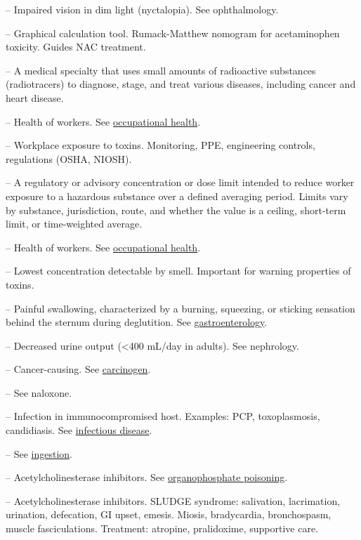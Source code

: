-- Impaired vision in dim light (nyctalopia). See ophthalmology.

-- Graphical calculation tool. Rumack-Matthew nomogram for acetaminophen toxicity. Guides NAC treatment.

-- A medical specialty that uses small amounts of radioactive substances (radiotracers) to diagnose, stage, and treat various diseases, including cancer and heart disease.

-- Health of workers. See \hyperlink{Occupational Health}{occupational health}.

-- Workplace exposure to toxins. Monitoring, PPE, engineering controls, regulations (OSHA, NIOSH).

-- A regulatory or advisory concentration or dose limit intended to reduce worker exposure to a hazardous substance over a defined averaging period. Limits vary by substance, jurisdiction, route, and whether the value is a ceiling, short-term limit, or time-weighted average.

-- Health of workers. See \hyperlink{Occupational Health}{occupational health}.

-- Lowest concentration detectable by smell. Important for warning properties of toxins.

-- Painful swallowing, characterized by a burning, squeezing, or sticking sensation behind the sternum during deglutition. See \hyperlink{Gastroenterology}{gastroenterology}.

-- Decreased urine output (<400 mL/day in adults). See nephrology.

-- Cancer-causing. See \hyperlink{Carcinogen}{carcinogen}.

-- See naloxone.

-- Infection in immunocompromised host. Examples: PCP, toxoplasmosis, candidiasis. See \hyperlink{Infectious Disease}{infectious disease}.

-- See \hyperlink{Ingestion}{ingestion}.

-- Acetylcholinesterase inhibitors. See \hyperlink{Organophosphate Poisoning}{organophosphate poisoning}.


-- Acetylcholinesterase inhibitors. SLUDGE syndrome: salivation, lacrimation, urination, defecation, GI upset, emesis. Miosis, bradycardia, bronchospasm, muscle fasciculations. Treatment: atropine, pralidoxime, supportive care.

